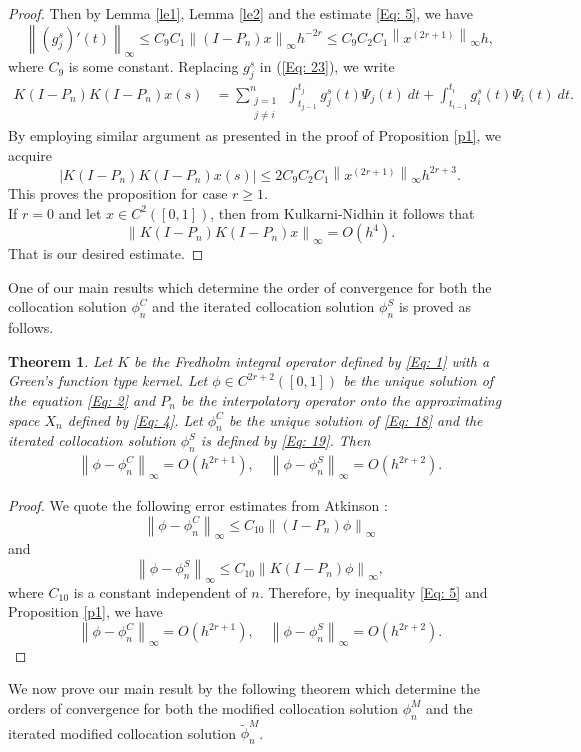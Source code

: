 \documentclass[sn-mathphys-num]{sn-jnl}%
\theoremstyle{thmstyleone}%
\newtheorem{theorem}{Theorem}%
\theoremstyle{thmstyletwo}%
\theoremstyle{thmstylethree}%
\newcommand{\norm}[1]{\left\lVert #1\right\rVert}
\begin{document}
\begin{proof}
	Then by Lemma \ref{le1}, Lemma \ref{le2} and the estimate \eqref{Eq: 5}, we have
	$$
	\norm{(g_j^s)'(t)}_\infty \le C_9 C_1 \norm{(I-P_n)x}_\infty h^{-2r}  \le C_9 C_2 C_1 \norm{x^{(2r + 1)}}_\infty h,
	$$
	where $C_9$ is some constant. Replacing $g_j^s$ in (\eqref{Eq: 23}), we write
	\begin{align*}
		K(I-P_n)K(I-P_n)x(s) &= \sum_{\substack{j=1 \\  j\ne i} }^{n}~ 	\int_{t_{j-1}}^{t_j}  g_j^s(t) \Psi_j(t) ~dt + \int_{t_{i-1}}^{t_i}  g_i^s(t) \Psi_i(t) ~dt.
	\end{align*}
	By employing similar argument as presented in the proof of Proposition \ref{p1}, we acquire 
	$$
	\left|K(I-P_n)K(I-P_n)x(s)\right| \le 2 C_9 C_2 C_1 \norm{x^{(2r + 1)}}_\infty h^{2r + 3}.
	$$
	This proves the proposition for case $r\ge 1$.\\
	If $r=0$ and let $x \in C^2([0,1])$, then from Kulkarni-Nidhin \cite[Proposition 3.7]{RPKTJN} it follows that
	$$
	\norm{K(I-P_n)K(I-P_n)x }_\infty = O(h^4).
	$$
	That is our desired estimate.
\end{proof}
One of our main results which determine the order of convergence for both the collocation solution $\phi_n^C$ and the iterated collocation solution $\phi_n^S$ is proved as follows.

\begin{theorem} \label{t4}
	Let $K$ be the Fredholm integral operator defined by \eqref{Eq: 1} with a Green's function type kernel. Let $\phi \in C^{2r+2}([0,1])$ be the unique solution of the equation  \eqref{Eq: 2} and $P_n$ be the interpolatory operator onto the approximating space $X_n$ defined by \eqref{Eq: 4}. Let $\phi_n^C$ be the unique solution of \eqref{Eq: 18} and the iterated collocation solution $\phi_n^S$ is defined by \eqref{Eq: 19}. Then
	\begin{eqnarray*} 
		\norm{\phi - \phi_n^C }_\infty = O\left(h^{2r +1}\right), \quad \norm{\phi - \phi_n^S }_\infty = O\left(h^{2r + 2}\right).
	\end{eqnarray*}
\end{theorem}

\begin{proof}
	We quote the following error estimates from Atkinson \cite[Section 3.4]{KEA0}:
	$$
	\norm{\phi - \phi_n^C }_\infty \leq C_{10} \norm{(I - P_n)\phi}_\infty
	$$
	and
	$$
	\norm{\phi - \phi_n^S }_\infty \leq  C_{10} \norm{K(I - P_n)\phi}_\infty,
	$$
	where $C_{10}$ is a constant independent of $n$. 
	Therefore, by inequality \eqref{Eq: 5} and Proposition \ref{p1}, we have
	$$
	\norm{\phi - \phi_n^C }_\infty = O\left(h^{2r + 1}\right), \quad \norm{\phi - \phi_n^S }_\infty = O\left(h^{2r + 2}\right).
	$$
\end{proof}
We now prove our main result by the following theorem which determine the orders of convergence for both the modified collocation solution $\phi_n^M$ and the iterated modified collocation solution $\tilde{\phi}_n^M$.
\end{document}
